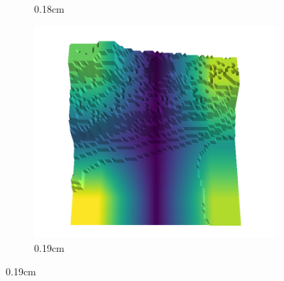 \documentclass[../document.tex]{subfiles}
\begin{document}
\begin{figure}[H]
\begin{subfigure}[b]{0.192\linewidth}
\caption{0.18cm}
\label{fig : quarry-false_negative-19}
\end{subfigure}
\begin{subfigure}[b]{0.192\linewidth}
\includegraphics[width=\linewidth]{../img/5/quarry/false_negative/19-patch-3d-majavi-colormap-200.png}
\caption{0.19cm}
\label{fig : quarry-false_negative-20}
\end{subfigure}
\label{fig : quarry-false_negative}
\end{figure}
\end{document}
